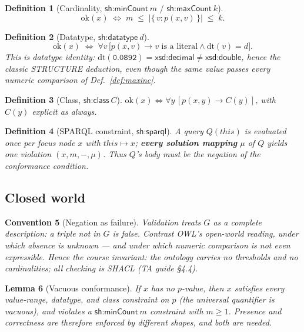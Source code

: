 \documentclass[11pt,a4paper]{article}
\newtheorem{definition}{Definition}[section]
\newtheorem{lemma}[definition]{Lemma}
\newtheorem{convention}[definition]{Convention}
\newcommand{\IRI}[1]{\textsf{#1}}                    %
\newcommand{\graph}{G}
\newcommand{\dtype}{\mathrm{dt}}
\newcommand{\dbl}{\IRI{xsd{:}double}}
\begin{document}
\begin{definition}[Cardinality, $\IRI{sh{:}minCount}\ m$ / $\IRI{sh{:}maxCount}\ k$]
\[
  \mathrm{ok}(x) \;\Longleftrightarrow\;
  m \;\le\; \bigl|\{\, v : p(x,v) \,\}\bigr| \;\le\; k .
\]
\end{definition}

\begin{definition}[Datatype, $\IRI{sh{:}datatype}\ d$]\label{def:datatype}
\[
  \mathrm{ok}(x) \;\Longleftrightarrow\; \forall v\, \bigl[p(x,v) \rightarrow
  v \text{ is a literal} \wedge \dtype(v) = d\bigr].
\]
This is datatype \emph{identity}: $\dtype(\texttt{0.0892}) = \IRI{xsd{:}decimal}
\ne \dbl$, hence the classic \textsf{STRUCTURE} deduction, even though the same
value passes every numeric comparison of Def.~\ref{def:maxinc}.
\end{definition}

\begin{definition}[Class, $\IRI{sh{:}class}\ C$]
$\mathrm{ok}(x) \Leftrightarrow \forall y\,[p(x,y) \rightarrow C(y)]$, with
$C(y)$ explicit as always.
\end{definition}

\begin{definition}[SPARQL constraint, $\IRI{sh{:}sparql}$]\label{def:sparql}
A query $Q(\mathit{this})$ is evaluated once per focus node $x$ with
$\mathit{this} \mapsto x$; \textbf{every solution mapping} $\mu$ of $Q$ yields
one violation $(x, m, -, \mu)$. Thus $Q$'s body must be the \emph{negation} of
the conformance condition.
\end{definition}

\subsection{Closed world}\label{sec:cwa}

\begin{convention}[Negation as failure]
Validation treats $\graph$ as a complete description: a triple not in $\graph$
is false. Contrast OWL's open-world reading, under which absence is unknown ---
and under which numeric comparison is not even expressible. Hence the course
invariant: \emph{the ontology carries no thresholds and no cardinalities; all
checking is SHACL} (TA guide \S4.4).
\end{convention}

\begin{lemma}[Vacuous conformance]\label{lem:vacuous}
If $x$ has no $p$-value, then $x$ satisfies every value-range, datatype, and
class constraint on $p$ (the universal quantifier is vacuous), and violates a
$\IRI{sh{:}minCount}\ m$ constraint with $m \ge 1$. Presence and correctness
are therefore enforced by \emph{different} shapes, and both are needed.
\end{lemma}
\end{document}
